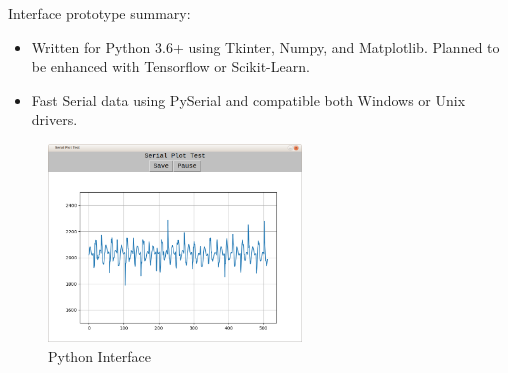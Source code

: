 \documentclass[a4paper,12pt,oneside,pdflatex,italian,final,twocolumn]{article}
\begin{document}
	Interface prototype summary:
	\begin{itemize}
		\item Written for Python 3.6+ using Tkinter, Numpy, and Matplotlib.
		Planned to be enhanced with Tensorflow or Scikit-Learn.

		\item Fast Serial data using PySerial and compatible both Windows or Unix drivers.
	\end{itemize}
		\begin{figure}[h]
		\centering
		\includegraphics[width=0.6\textwidth]{images/protoiface.png}
		\caption{Python Interface}
	\end{figure}
\end{document}
